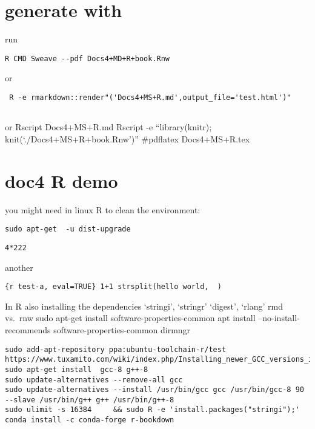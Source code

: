 \hypertarget{generate-with}{%
\section{generate with}\label{generate-with}}

run

\begin{verbatim}
R CMD Sweave --pdf Docs4+MD+R+book.Rnw 
\end{verbatim}

or

\begin{verbatim}
 R -e rmarkdown::render"('Docs4+MS+R.md',output_file='test.html')"
 
\end{verbatim}

or Rscript Docs4+MS+R.md Rscript -e ``library(knitr);
knit(`./Docs4+MS+R+book.Rnw')'' \#pdflatex Docs4+MS+R.tex

\hypertarget{doc4-r-demo}{%
\section{doc4 R demo}\label{doc4-r-demo}}

you might need in linux R to clean the environment:

\begin{verbatim}
sudo apt-get  -u dist-upgrade
\end{verbatim}

\begin{verbatim}
4*222
\end{verbatim}

another

\texttt{\{r\ test-a,\ eval=TRUE\}\ 1+1\ strsplit(\textquotesingle{}hello\ world\textquotesingle{},\ \textquotesingle{}\ \textquotesingle{})}

In R also installing the dependencies `stringi', `stringr' `digest',
`rlang' rmd vs.~rnw sudo apt-get install software-properties-common apt
install --no-install-recommends software-properties-common dirmngr

\begin{verbatim}
sudo add-apt-repository ppa:ubuntu-toolchain-r/test
https://www.tuxamito.com/wiki/index.php/Installing_newer_GCC_versions_in_Ubuntu
sudo apt-get install  gcc-8 g++-8
sudo update-alternatives --remove-all gcc
sudo update-alternatives --install /usr/bin/gcc gcc /usr/bin/gcc-8 90 --slave /usr/bin/g++ g++ /usr/bin/g++-8
sudo ulimit -s 16384     && sudo R -e 'install.packages("stringi");'
conda install -c conda-forge r-bookdown
\end{verbatim}

